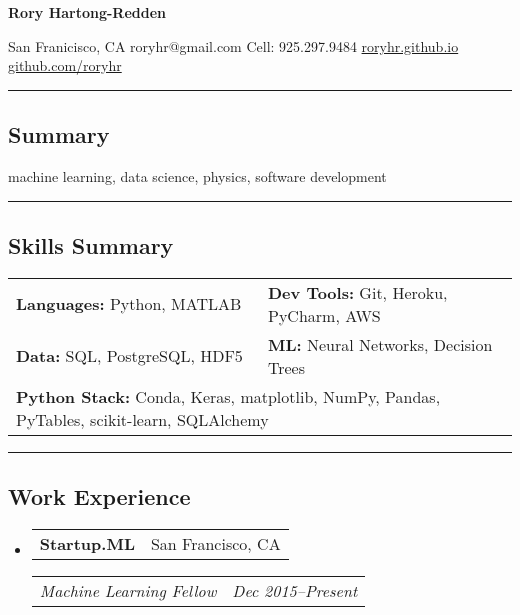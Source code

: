 \documentclass[10pt,letterpaper]{article}
\makeatletter
\newenvironment{indentsection}[1]%
{\begin{list}{}%
	{\setlength{\leftmargin}{#1}}%
	\item[]%
}
{\end{list}}
\newcommand{\headerrow}[2]
{\begin{tabular*}{\linewidth}{l@{\extracolsep{\fill}}r}
	#1 &
	#2 \\
\end{tabular*}}
\makeatother
\begin{document}
{\raggedright \LARGE \bf Rory Hartong-Redden\\}

{\raggedleft 
San Franicisco, CA \textbar\/ 
roryhr@gmail.com \textbar\/ 
Cell: 925.297.9484 \textbar\/ 
\href{roryhr.github.io}{roryhr.github.io} \textbar\/   
\href{https://github.com/roryhr}{github.com/roryhr}\\}
\hrule

\subsection*{Summary}
\begin{centering}  
machine learning, data science, physics, software development\\
\end{centering}

\hrule
\subsection*{Skills Summary}
\begin{indentsection}{\parindent}
\begin{tabular}{p{0.5\linewidth}   p{0.5\linewidth} } 
	\textbf{Languages:}  Python, MATLAB 	
	& \textbf{Dev Tools:}  Git, Heroku, PyCharm, AWS \\  

	\textbf{Data:} SQL, PostgreSQL, HDF5
	& \textbf{ML:} Neural Networks, Decision Trees  \\
	
	\multicolumn{2}{l}{\textbf{Python Stack:} Conda, Keras, matplotlib, NumPy, Pandas, PyTables, scikit-learn, SQLAlchemy} \\
\end{tabular}
\end{indentsection}

\hrule
\subsection*{Work Experience}
\begin{itemize}
	\parskip=-0.1em
	\item
	\headerrow
		{\textbf{Startup.ML}}
		{San Francisco, CA}
	\headerrow
		{\emph{Machine Learning Fellow}}
		{\emph{Dec 2015--Present}}
\end{itemize}
\end{document}
